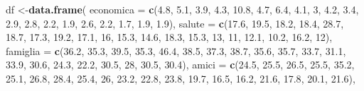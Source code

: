 \documentclass[]{book}
\newenvironment{Shaded}{\begin{snugshade}}{\end{snugshade}}
\newcommand{\KeywordTok}[1]{\textcolor[rgb]{0.13,0.29,0.53}{\textbf{#1}}}
\newcommand{\DataTypeTok}[1]{\textcolor[rgb]{0.13,0.29,0.53}{#1}}
\newcommand{\DecValTok}[1]{\textcolor[rgb]{0.00,0.00,0.81}{#1}}
\newcommand{\FloatTok}[1]{\textcolor[rgb]{0.00,0.00,0.81}{#1}}
\newcommand{\NormalTok}[1]{#1}
\begin{document}
\begin{Shaded}
\begin{Highlighting}[]
\NormalTok{df <-}\KeywordTok{data.frame}\NormalTok{(}
  \DataTypeTok{economica =} \KeywordTok{c}\NormalTok{(}\FloatTok{4.8}\NormalTok{, }\FloatTok{5.1}\NormalTok{, }\FloatTok{3.9}\NormalTok{, }\FloatTok{4.3}\NormalTok{, }\FloatTok{10.8}\NormalTok{, }\FloatTok{4.7}\NormalTok{, }\FloatTok{6.4}\NormalTok{, }\FloatTok{4.1}\NormalTok{, }\DecValTok{3}\NormalTok{, }\FloatTok{4.2}\NormalTok{, }
                \FloatTok{3.4}\NormalTok{, }\FloatTok{2.9}\NormalTok{, }\FloatTok{2.8}\NormalTok{, }\FloatTok{2.2}\NormalTok{, }\FloatTok{1.9}\NormalTok{, }\FloatTok{2.6}\NormalTok{, }\FloatTok{2.2}\NormalTok{, }\FloatTok{1.7}\NormalTok{, }\FloatTok{1.9}\NormalTok{, }\FloatTok{1.9}\NormalTok{),}
  \DataTypeTok{salute =} \KeywordTok{c}\NormalTok{(}\FloatTok{17.6}\NormalTok{, }\FloatTok{19.5}\NormalTok{, }\FloatTok{18.2}\NormalTok{, }\FloatTok{18.4}\NormalTok{, }\FloatTok{28.7}\NormalTok{, }\FloatTok{18.7}\NormalTok{, }\FloatTok{17.3}\NormalTok{, }\FloatTok{19.2}\NormalTok{, }\FloatTok{17.1}\NormalTok{, }\DecValTok{16}\NormalTok{, }
             \FloatTok{15.3}\NormalTok{, }\FloatTok{14.6}\NormalTok{, }\FloatTok{18.3}\NormalTok{, }\FloatTok{15.3}\NormalTok{, }\DecValTok{13}\NormalTok{, }\DecValTok{11}\NormalTok{, }\FloatTok{12.1}\NormalTok{, }\FloatTok{10.2}\NormalTok{, }\FloatTok{16.2}\NormalTok{, }\DecValTok{12}\NormalTok{),}
  \DataTypeTok{famiglia =} \KeywordTok{c}\NormalTok{(}\FloatTok{36.2}\NormalTok{, }\FloatTok{35.3}\NormalTok{, }\FloatTok{39.5}\NormalTok{, }\FloatTok{35.3}\NormalTok{, }\FloatTok{46.4}\NormalTok{, }\FloatTok{38.5}\NormalTok{, }\FloatTok{37.3}\NormalTok{, }\FloatTok{38.7}\NormalTok{, }\FloatTok{35.6}\NormalTok{, }\FloatTok{35.7}\NormalTok{, }
               \FloatTok{33.7}\NormalTok{, }\FloatTok{31.1}\NormalTok{, }\FloatTok{33.9}\NormalTok{, }\FloatTok{30.6}\NormalTok{, }\FloatTok{24.3}\NormalTok{, }\FloatTok{22.2}\NormalTok{, }\FloatTok{30.5}\NormalTok{, }\DecValTok{28}\NormalTok{, }\FloatTok{30.5}\NormalTok{, }\FloatTok{30.4}\NormalTok{),}
  \DataTypeTok{amici =} \KeywordTok{c}\NormalTok{(}\FloatTok{24.5}\NormalTok{, }\FloatTok{25.5}\NormalTok{, }\FloatTok{26.5}\NormalTok{, }\FloatTok{25.5}\NormalTok{, }\FloatTok{35.2}\NormalTok{, }\FloatTok{25.1}\NormalTok{, }\FloatTok{26.8}\NormalTok{, }\FloatTok{28.4}\NormalTok{, }\FloatTok{25.4}\NormalTok{, }\DecValTok{26}\NormalTok{, }
            \FloatTok{23.2}\NormalTok{, }\FloatTok{22.8}\NormalTok{, }\FloatTok{23.8}\NormalTok{, }\FloatTok{19.7}\NormalTok{, }\FloatTok{16.5}\NormalTok{, }\FloatTok{16.2}\NormalTok{, }\FloatTok{21.6}\NormalTok{, }\FloatTok{17.8}\NormalTok{, }\FloatTok{20.1}\NormalTok{, }\FloatTok{21.6}\NormalTok{), }

\end{Highlighting}
\end{Shaded}
\end{document}
